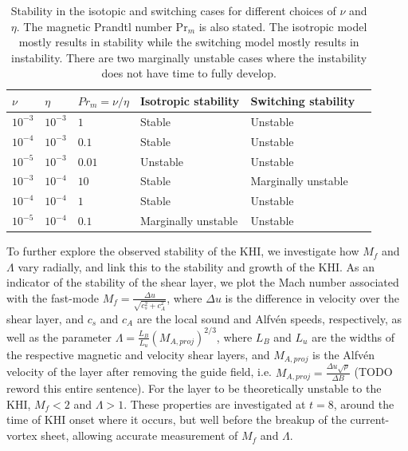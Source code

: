 \begin{table}[]
\centering
\begin{tabular}{llllll}
$\nu$    & $\eta$    & $Pr_m = \nu/\eta$ & Isotropic stability & Switching stability &  \\
\midrule
$10^{-3}$ & $10^{-3}$ & $1$ & Stable                 & Unstable                 &  \\
$10^{-4}$ & $10^{-3}$ & $0.1$ & Stable                 & Unstable                 &  \\
$10^{-5}$ & $10^{-3}$ & $0.01$ & Unstable                 & Unstable                 &  \\
$10^{-3}$ & $10^{-4}$ & $10$ & Stable                 & Marginally unstable                 &  \\
$10^{-4}$ & $10^{-4}$ & $1$ & Stable                 & Unstable                 &  \\
$10^{-5}$ & $10^{-4}$ & $0.1$ & Marginally unstable                 & Unstable                 & 
\end{tabular}
\caption{Stability in the isotopic and switching cases for different choices of $\nu$ and $\eta$. The magnetic Prandtl number Pr$_m$ is also stated. The isotropic model mostly results in stability while the switching model mostly results in instability. There are two marginally unstable cases where the instability does not have time to fully develop.}
\label{tab:stability}
\end{table}

To further explore the observed stability of the KHI, we investigate how $M_f$ and $\Lambda$ vary radially, and link this to the stability and growth of the KHI. As an indicator of the stability of the shear layer, we plot the Mach number associated with the fast-mode $M_f = \frac{\Delta u}{\sqrt{c_s^2 + c_A^2}}$, where $\Delta u$ is the difference in velocity over the shear layer, and $c_s$ and $c_A$ are the local sound and Alfv\'en speeds, respectively, as well as the parameter $\Lambda = \frac{L_B}{L_u}(M_{A, proj})^{2/3}$, where $L_B$ and $L_u$ are the widths of the respective magnetic and velocity shear layers, and $M_{A, proj}$ is the Alfv\'en velocity of the layer after removing the guide field, i.e. $M_{A, proj} = \frac{\Delta u \sqrt{\rho}}{\Delta B}$ (TODO reword this entire sentence). For the layer to be theoretically unstable to the KHI, $M_f < 2$ and $\Lambda > 1$. These properties are investigated at $t=8$, around the time of KHI onset where it occurs, but well before the breakup of the current-vortex sheet, allowing accurate measurement of $M_f$ and $\Lambda$.


